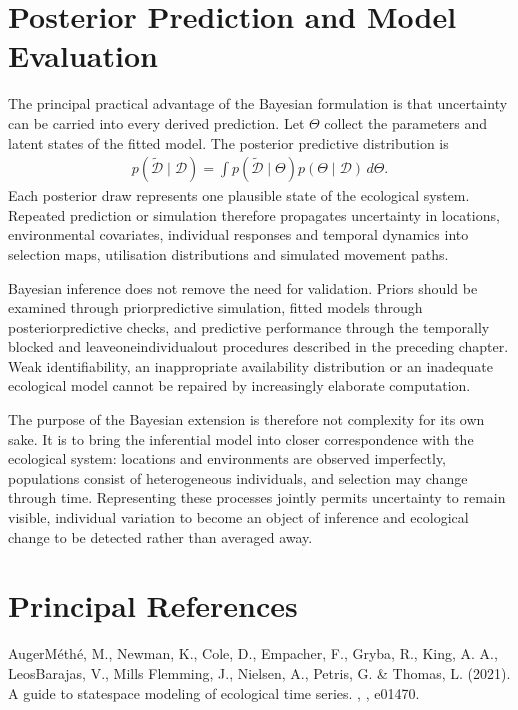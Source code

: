 \documentclass[letterpaper,10pt,english]{sphinxmanual}
\begin{document}
\section{Posterior Prediction and Model Evaluation}
\label{\detokenize{theory:posterior-prediction-and-model-evaluation}}
\sphinxAtStartPar
The principal practical advantage of the Bayesian formulation is that uncertainty can be carried into every derived prediction. Let \(\Theta\) collect the parameters and latent states of the fitted model. The posterior predictive distribution is
\begin{equation*}
\begin{split}
p
\left(
\tilde{\mathcal{D}}
\mid
\mathcal{D}
\right)
=
\int
p
\left(
\tilde{\mathcal{D}}
\mid
\Theta
\right)
p
\left(
\Theta
\mid
\mathcal{D}
\right)
\,d\Theta.
\end{split}
\end{equation*}
\sphinxAtStartPar
Each posterior draw represents one plausible state of the ecological system. Repeated prediction or simulation therefore propagates uncertainty in locations, environmental covariates, individual responses and temporal dynamics into selection maps, utilisation distributions and simulated movement paths.

\sphinxAtStartPar
Bayesian inference does not remove the need for validation. Priors should be examined through prior\sphinxhyphen{}predictive simulation, fitted models through posterior\sphinxhyphen{}predictive checks, and predictive performance through the temporally blocked and leave\sphinxhyphen{}one\sphinxhyphen{}individual\sphinxhyphen{}out procedures described in the preceding chapter. Weak identifiability, an inappropriate availability distribution or an inadequate ecological model cannot be repaired by increasingly elaborate computation.

\sphinxAtStartPar
The purpose of the Bayesian extension is therefore not complexity for its own sake. It is to bring the inferential model into closer correspondence with the ecological system: locations and environments are observed imperfectly, populations consist of heterogeneous individuals, and selection may change through time. Representing these processes jointly permits uncertainty to remain visible, individual variation to become an object of inference and ecological change to be detected rather than averaged away.


\section{Principal References}
\label{\detokenize{theory:principal-references}}
\sphinxAtStartPar
Auger\sphinxhyphen{}Méthé, M., Newman, K., Cole, D., Empacher, F., Gryba, R., King, A. A., Leos\sphinxhyphen{}Barajas, V., Mills Flemming, J., Nielsen, A., Petris, G. \& Thomas, L. (2021). A guide to state\sphinxhyphen{}space modeling of ecological time series. , , e01470.
\end{document}
